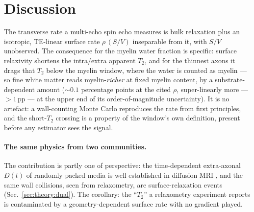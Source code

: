 \section{Discussion}
\label{sec:discussion}

The transverse rate a multi-echo spin echo measures is bulk relaxation plus an isotropic,
TE-linear surface rate $\rho\,(S/V)$ inseparable from it, with $S/V$ unobserved. The
consequence for the myelin water fraction is specific: surface relaxivity shortens the
intra/extra apparent $T_2$, and for the thinnest axons it drags that $T_2$ below the
myelin window, where the water is counted as myelin --- so fine white matter reads
myelin-\emph{richer} at fixed myelin content, by a substrate-dependent amount (${\sim}0.1$
percentage points at the cited $\rho$, super-linearly more --- $>1$\,pp --- at the upper
end of its order-of-magnitude uncertainty). It is no artefact: a wall-counting Monte Carlo
reproduces the rate from first principles, and the short-$T_2$ crossing is a property of
the window's own definition, present before any estimator sees the signal.

\paragraph{The same physics from two communities.} The contribution is partly one of
perspective: the time-dependent extra-axonal $D(t)$ of randomly packed media is well
established in diffusion MRI \citep{Novikov2014, Burcaw2015, Fieremans2016}, and the same
wall collisions, seen from relaxometry, are surface-relaxation events (Sec.~\ref{sec:theory:dual}).
The corollary: the ``$T_2$'' a relaxometry experiment reports is contaminated by a
geometry-dependent surface rate with no gradient played.

